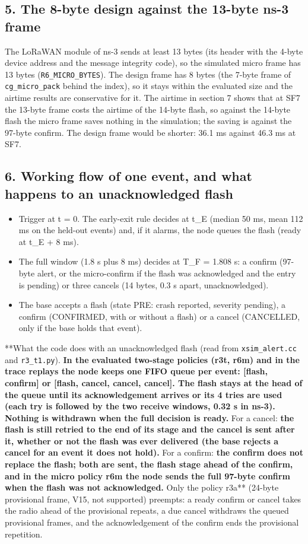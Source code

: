 \subsection*{5. The 8-byte design against the 13-byte ns-3 frame}

The LoRaWAN module of ns-3 sends at least 13 bytes (its header with the 4-byte device address and the message integrity code), so the simulated micro frame has 13 bytes (\texttt{R6\_MICRO\_BYTES}). The design frame has 8 bytes (the 7-byte frame of \texttt{cg\_micro\_pack} behind the index), so it stays within the evaluated size and the airtime results are conservative for it. The airtime in section 7 shows that at SF7 the 13-byte frame costs the airtime of the 14-byte flash, so against the 14-byte flash the micro frame saves nothing in the simulation; the saving is against the 97-byte confirm. The design frame would be shorter: 36.1 ms against 46.3 ms at SF7.

\subsection*{6. Working flow of one event, and what happens to an unacknowledged flash}

\begin{itemize}
\item Trigger at t = 0. The early-exit rule decides at t\_E (median 50 ms, mean 112 ms on the held-out events) and, if it alarms, the node queues the flash (ready at t\_E + 8 ms).
\item The full window (1.8 s plus 8 ms) decides at T\_F = 1.808 s: a confirm (97-byte alert, or the micro-confirm if the flash was acknowledged and the entry is pending) or three cancels (14 bytes, 0.3 s apart, unacknowledged).
\item The base accepts a flash (state PRE: crash reported, severity pending), a confirm (CONFIRMED, with or without a flash) or a cancel (CANCELLED, only if the base holds that event).
\end{itemize}

**What the code does with an unacknowledged flash (read from \texttt{xsim\_alert.cc} and \texttt{r3\_t1.py}).\textbf{ In the evaluated two-stage policies (r3t, r6m) and in the trace replays the node keeps one FIFO queue per event: [flash, confirm] or [flash, cancel, cancel, cancel]. The flash stays at the head of the queue until its acknowledgement arrives or its 4 tries are used (each try is followed by the two receive windows, 0.32 s in ns-3). Nothing is withdrawn when the full decision is ready. }For a cancel:\textbf{ the flash is still retried to the end of its stage and the cancel is sent after it, whether or not the flash was ever delivered (the base rejects a cancel for an event it does not hold). }For a confirm:\textbf{ the confirm does not replace the flash; both are sent, the flash stage ahead of the confirm, and in the micro policy r6m the node sends the full 97-byte confirm when the flash was not acknowledged. }Only the policy r3a** (24-byte provisional frame, V15, not supported) preempts: a ready confirm or cancel takes the radio ahead of the provisional repeats, a due cancel withdraws the queued provisional frames, and the acknowledgement of the confirm ends the provisional repetition.

